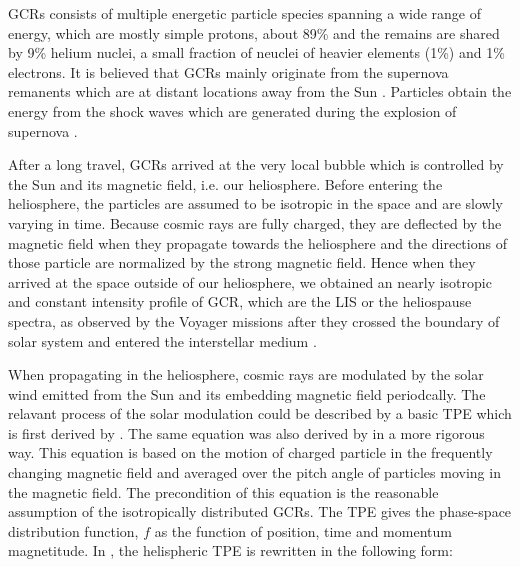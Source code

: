 \acp{GCR} consists of multiple energetic particle species spanning a wide range of energy, which are mostly simple protons, about 89\% and the remains are shared by 9\% helium nuclei, a small fraction of neuclei of heavier elements (1\%) and 1\% electrons. %
It is believed that \acp{GCR} mainly originate from the supernova remanents which are at distant locations away from the Sun \citep{Blasi2013AARv2013,Bhattacarjee2000PhR,Fermi1949PhRv}. Particles obtain the energy from the shock waves which are generated during the explosion of supernova \citep{blandford1978particle}.

After a long travel, \acp{GCR} arrived at the very local bubble which is controlled by the Sun and its magnetic field, i.e. our heliosphere.
Before entering the heliosphere, the particles are assumed to be isotropic in the space and are slowly varying in time. Because cosmic rays are fully charged, they are deflected by the magnetic field when they propagate towards the heliosphere and the directions of those particle are normalized by the strong magnetic field. Hence when they arrived at the space outside of our heliosphere, we obtained an nearly isotropic and constant intensity profile of \ac{GCR}, which are the \ac{LIS} or the heliospause spectra, as observed by the Voyager missions after they crossed the boundary of solar system and entered the interstellar medium \citep{Stone2013Sci, Cummings2016ApJ,Stone2019NatAs}.



When propagating in the heliosphere, cosmic rays are modulated by the solar wind emitted from the Sun and its embedding magnetic field periodcally. The relavant process of the solar modulation could be described by a basic \ac{TPE} which is first derived by \citet{Parker1965Pss}. The same equation was also derived by \citet{Gleeson1967ApJ} in a more rigorous way. This equation is based on the motion of charged particle in the frequently changing magnetic field and averaged over the pitch angle of particles moving in the magnetic field. The precondition of this equation is the reasonable assumption of the isotropically distributed \acp{GCR}. The \ac{TPE} gives the phase-space distribution function, $f$ as the function of position, time and momentum magnetitude. In \citet{Potgieter2013LRSP}, the helispheric \ac{TPE} is rewritten in the following form:

